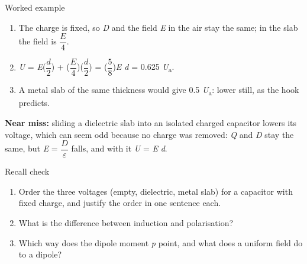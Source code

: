 \documentclass[11pt]{article}
\begin{document}
\begin{keepsection}
\begin{keepsection}
\begin{workedbox}{Worked example}
\begin{enumerate}
\item The charge is fixed, so \textit{D} and the field \textit{E} in the air stay the same; in the slab the field is {\small\ensuremath{\dfrac{{E}}{4}}}.
\item \textit{U} = \textit{E}({\small\ensuremath{\dfrac{{d}}{2}}}) + ({\small\ensuremath{\dfrac{{E}}{4}}})({\small\ensuremath{\dfrac{{d}}{2}}}) = ({\small\ensuremath{\dfrac{5}{8}}})\textit{E d} = 0.625 \textit{U}\textsubscript{a}.
\item A metal slab of the same thickness would give 0.5 \textit{U}\textsubscript{a}: lower still, as the hook predicts.
\end{enumerate}
\end{workedbox}

\begin{notebox}\textbf{Near miss:} sliding a dielectric slab into an isolated charged capacitor lowers its voltage, which can seem odd because no charge was removed: \textit{Q} and \textit{D} stay the same, but \textit{E} = {\small\ensuremath{\dfrac{{D}}{ε}}} falls, and with it \textit{U} = \textit{E} \textit{d}.\end{notebox}

\begin{recallbox}{Recall check}
\begin{enumerate}
\item Order the three voltages (empty, dielectric, metal slab) for a capacitor with fixed charge, and justify the order in one sentence each.
\item What is the difference between induction and polarisation?
\item Which way does the dipole moment \textit{p} point, and what does a uniform field do to a dipole?
\end{enumerate}

\end{recallbox}
\end{keepsection}
\end{keepsection}
\end{document}

